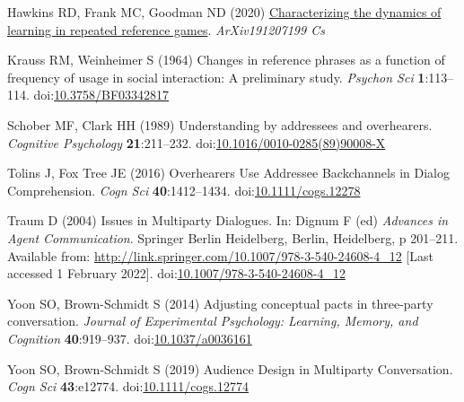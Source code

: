 \documentclass[
  english,
  a4paper,
]{article}
\newlength{\cslhangindent}
\newlength{\cslentryspacingunit} %
\newenvironment{CSLReferences}[2] %
 {%
  \setlength{\parindent}{0pt}
  \ifodd #1
  \let\oldpar\par
  \def\par{\hangindent=\cslhangindent\oldpar}
  \fi
  \setlength{\parskip}{#2\cslentryspacingunit}
 }%
 {}
\begin{document}
\begin{CSLReferences}{1}{0}
\leavevmode{}%
Hawkins RD, Frank MC, Goodman ND (2020) \href{http://arxiv.org/abs/1912.07199}{Characterizing the dynamics of learning in repeated reference games}. \emph{ArXiv191207199 Cs}

\leavevmode{}%
Krauss RM, Weinheimer S (1964) Changes in reference phrases as a function of frequency of usage in social interaction: A preliminary study. \emph{Psychon Sci} \textbf{1}:113--114. doi:\href{https://doi.org/10.3758/BF03342817}{10.3758/BF03342817}

\leavevmode{}%
Schober MF, Clark HH (1989) Understanding by addressees and overhearers. \emph{Cognitive Psychology} \textbf{21}:211--232. doi:\href{https://doi.org/10.1016/0010-0285(89)90008-X}{10.1016/0010-0285(89)90008-X}

\leavevmode{}%
Tolins J, Fox Tree JE (2016) Overhearers {Use Addressee Backchannels} in {Dialog Comprehension}. \emph{Cogn Sci} \textbf{40}:1412--1434. doi:\href{https://doi.org/10.1111/cogs.12278}{10.1111/cogs.12278}

\leavevmode{}%
Traum D (2004) Issues in {Multiparty Dialogues}. In: Dignum F (ed) \emph{Advances in {Agent Communication}}. {Springer Berlin Heidelberg}, {Berlin, Heidelberg}, p 201--211. Available from: \url{http://link.springer.com/10.1007/978-3-540-24608-4_12} {[}Last accessed 1 February 2022{]}. doi:\href{https://doi.org/10.1007/978-3-540-24608-4_12}{10.1007/978-3-540-24608-4\_12}

\leavevmode{}%
Yoon SO, Brown-Schmidt S (2014) Adjusting conceptual pacts in three-party conversation. \emph{Journal of Experimental Psychology: Learning, Memory, and Cognition} \textbf{40}:919--937. doi:\href{https://doi.org/10.1037/a0036161}{10.1037/a0036161}

\leavevmode{}%
Yoon SO, Brown‐Schmidt S (2019) Audience {Design} in {Multiparty Conversation}. \emph{Cogn Sci} \textbf{43}:e12774. doi:\href{https://doi.org/10.1111/cogs.12774}{10.1111/cogs.12774}

\end{CSLReferences}
\end{document}
